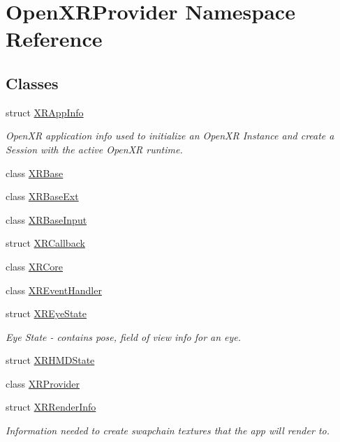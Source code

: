 \hypertarget{namespace_open_x_r_provider}{}\section{Open\+X\+R\+Provider Namespace Reference}
\label{namespace_open_x_r_provider}
\subsection*{Classes}
\begin{DoxyCompactItemize}
\item 
struct \mbox{\hyperlink{struct_open_x_r_provider_1_1_x_r_app_info}{X\+R\+App\+Info}}
\begin{DoxyCompactList}\small\item\em Open\+XR application info used to initialize an Open\+XR Instance and create a Session with the active Open\+XR runtime. \end{DoxyCompactList}\item 
class \mbox{\hyperlink{class_open_x_r_provider_1_1_x_r_base}{X\+R\+Base}}
\item 
class \mbox{\hyperlink{class_open_x_r_provider_1_1_x_r_base_ext}{X\+R\+Base\+Ext}}
\item 
class \mbox{\hyperlink{class_open_x_r_provider_1_1_x_r_base_input}{X\+R\+Base\+Input}}
\item 
struct \mbox{\hyperlink{struct_open_x_r_provider_1_1_x_r_callback}{X\+R\+Callback}}
\item 
class \mbox{\hyperlink{class_open_x_r_provider_1_1_x_r_core}{X\+R\+Core}}
\item 
class \mbox{\hyperlink{class_open_x_r_provider_1_1_x_r_event_handler}{X\+R\+Event\+Handler}}
\item 
struct \mbox{\hyperlink{struct_open_x_r_provider_1_1_x_r_eye_state}{X\+R\+Eye\+State}}
\begin{DoxyCompactList}\small\item\em Eye State -\/ contains pose, field of view info for an eye. \end{DoxyCompactList}\item 
struct \mbox{\hyperlink{struct_open_x_r_provider_1_1_x_r_h_m_d_state}{X\+R\+H\+M\+D\+State}}
\item 
class \mbox{\hyperlink{class_open_x_r_provider_1_1_x_r_provider}{X\+R\+Provider}}
\item 
struct \mbox{\hyperlink{struct_open_x_r_provider_1_1_x_r_render_info}{X\+R\+Render\+Info}}
\begin{DoxyCompactList}\small\item\em Information needed to create swapchain textures that the app will render to. \end{DoxyCompactList}\end{DoxyCompactItemize}
